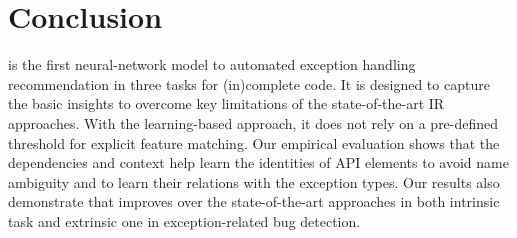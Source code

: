 \section{Conclusion}

{\tool} is the first neural-network model to automated exception
handling recommendation in three tasks for (in)complete code. It is
designed to capture the basic insights to overcome key limitations of
the state-of-the-art IR approaches. With the learning-based approach,
it does not rely on a pre-defined threshold for explicit feature
matching. Our empirical evaluation shows that the dependencies and
context help {\tool} learn the identities of API elements to avoid
name ambiguity and to learn their relations with the exception
types. Our results also demonstrate that {\tool} improves over the
state-of-the-art approaches in both intrinsic task and extrinsic one
in exception-related bug detection.

